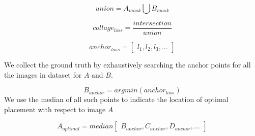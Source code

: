\documentclass{article}
\begin{document}
\begin{equation}
union = A_{mask} \bigcup B_{mask}
\end{equation}

\begin{equation}
collage_{loss} = \frac{intersection}{union}
\label{eq:collage_loss}
\end{equation}

\begin{equation}
anchor_{loss} = 
\begin{bmatrix}
l_{1}, l_{2}, l_{3}, \ldots 
\end{bmatrix}
\label{eq:anchorloss}
\end{equation}

We collect the ground truth by exhaustively searching the anchor points for all the images in dataset for $A$ and $B$.

\begin{equation}
    B_{anchor} = argmin(anchor_{loss})
\end{equation}
We use the median of all such points to indicate the location of optimal placement with respect to image $A$

\begin{equation}
A_{optimal} = median
\begin{bmatrix}
 B_{anchor}, C_{anchor}, D_{anchor}, \ldots 
\end{bmatrix}
\label{eq:anchorloss}
\end{equation}

\pageref{fig:learned_collage_output}
\end{document}
